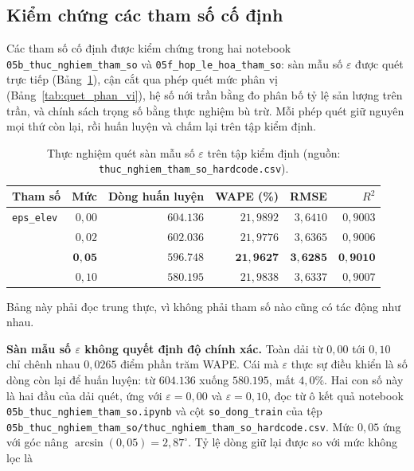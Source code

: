 \FloatBarrier
\subsection{Kiểm chứng các tham số cố định}

Các tham số cố định được kiểm chứng trong hai notebook
\texttt{05b\_thuc\_nghiem\_tham\_so} và \texttt{05f\_hop\_le\_hoa\_tham\_so}: sàn mẫu số
$\varepsilon$ được quét trực tiếp (Bảng~\ref{tab:quet_tham_so}), cận cắt qua phép quét mức
phân vị (Bảng~\ref{tab:quet_phan_vi}), hệ số nới trần bằng đo phân bố tỷ lệ sản lượng trên
trần, và chính sách trọng số bằng thực nghiệm bù trừ. Mỗi phép quét giữ nguyên mọi thứ còn
lại, rồi huấn luyện và chấm lại trên tập kiểm định.

\begin{table}[htbp]
\centering
\caption{Thực nghiệm quét sàn mẫu số $\varepsilon$ trên tập kiểm định (nguồn: \texttt{thuc\_nghiem\_tham\_so\_hardcode.csv}).}
\label{tab:quet_tham_so}
\small
\begin{tabular}{l r r r r r}
\toprule
\textbf{Tham số} & \textbf{Mức} & \textbf{Dòng huấn luyện} & \textbf{WAPE (\%)} & \textbf{RMSE} & \textbf{$R^2$} \\
\midrule
\texttt{eps\_elev}
 & $0{,}00$ & $604.136$ & $21{,}9892$ & $3{,}6410$ & $0{,}9003$ \\
 & $0{,}02$ & $602.036$ & $21{,}9776$ & $3{,}6365$ & $0{,}9006$ \\
 & $\mathbf{0{,}05}$ & $\mathbf{596.748}$ & $\mathbf{21{,}9627}$ & $\mathbf{3{,}6285}$ & $\mathbf{0{,}9010}$ \\
 & $0{,}10$ & $580.195$ & $21{,}9838$ & $3{,}6337$ & $0{,}9007$ \\
\bottomrule
\end{tabular}
\end{table}

Bảng này phải đọc trung thực, vì không phải tham số nào cũng có tác động như nhau.

\textbf{Sàn mẫu số $\varepsilon$ không quyết định độ chính xác.} Toàn dải từ $0{,}00$ tới
$0{,}10$ chỉ chênh nhau $0{,}0265$ điểm phần trăm WAPE. Cái mà $\varepsilon$ thực sự điều
khiển là số dòng còn lại để huấn luyện: từ $604.136$ xuống $580.195$, mất $4{,}0\%$. Hai
con số này là hai đầu của dải quét, ứng với $\varepsilon = 0{,}00$ và $\varepsilon = 0{,}10$,
đọc từ ô kết quả notebook \texttt{05b\_thuc\_nghiem\_tham\_so.ipynb} và cột
\texttt{so\_dong\_train} của tệp \texttt{05b\_thuc\_nghiem\_tham\_so/thuc\_nghiem\_tham\_so\_hardcode.csv}.
Mức $0{,}05$ ứng với góc nâng $\arcsin(0{,}05) = 2{,}87^\circ$. Tỷ lệ dòng giữ lại được so với mức
không lọc là

